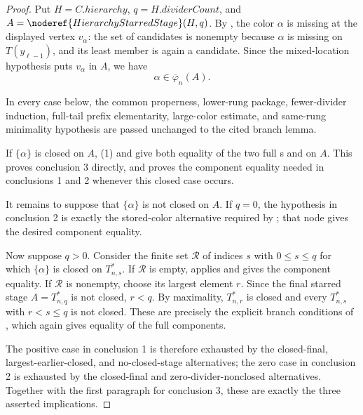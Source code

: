 \begin{proof}
Put $H=C.\mathit{hierarchy}$,
$q=H.\mathit{dividerCount}$, and
$A=\noderef{HierarchyStarredStage}(H,q)$.  By
, the color $\alpha$ is missing
at the displayed vertex $v_\alpha$: the set of candidates is nonempty
because $\alpha$ is missing on $T(y_{\ell-1})$, and its least member is
again a candidate.  Since the mixed-location hypothesis puts
$v_\alpha$ in $A$, we have
\[
                    \alpha\in\overline\varphi_n(A).           \tag{1}
\]

In every case below, the common properness, lower-rung package,
fewer-divider induction, full-tail prefix elementarity, large-color
estimate, and same-rung minimality hypothesis are passed unchanged to
the cited branch lemma.

If $\{\alpha\}$ is closed on $A$, (1) and
 give both equality of the two
full s and
 on $A$.  This proves conclusion 3
directly, and proves the component equality needed in conclusions 1
and 2 whenever this closed case occurs.

It remains to suppose that $\{\alpha\}$ is not closed on $A$.  If
$q=0$, the hypothesis in conclusion 2 is exactly the stored-color
alternative required by
; that node gives the desired
component equality.

Now suppose $q>0$.  Consider the finite set $\mathcal R$ of indices
$s$ with $0\leq s\leq q$ for which $\{\alpha\}$ is closed on
$T_{n,s}^{*}$.  If $\mathcal R$ is empty,
 applies and gives the component
equality.  If $\mathcal R$ is nonempty, choose its largest element
$r$.  Since the final starred stage $A=T_{n,q}^{*}$ is not closed,
$r<q$.  By maximality, $T_{n,r}^{*}$ is closed and every
$T_{n,s}^{*}$ with $r<s\leq q$ is not closed.  These are precisely the
explicit branch conditions of
, which again gives equality of
the full components.

The positive case in conclusion 1 is therefore exhausted by the
closed-final, largest-earlier-closed, and no-closed-stage alternatives;
the zero case in conclusion 2 is exhausted by the closed-final and
zero-divider-nonclosed alternatives.  Together with the first
paragraph for conclusion 3, these are exactly the three asserted
implications.
\end{proof}
